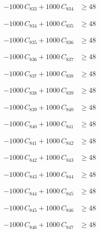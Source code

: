 \documentclass[a4paper,11pt]{article}
\begin{document}
\begin{align}
-1000\,C_{833} + 1000\,C_{834} &\geq 48 \nonumber
\end{align}

\begin{align}
-1000\,C_{834} + 1000\,C_{835} &\geq 48 \nonumber
\end{align}

\begin{align}
-1000\,C_{835} + 1000\,C_{836} &\geq 48 \nonumber
\end{align}

\begin{align}
-1000\,C_{836} + 1000\,C_{837} &\geq 48 \nonumber
\end{align}

\begin{align}
-1000\,C_{837} + 1000\,C_{838} &\geq 48 \nonumber
\end{align}

\begin{align}
-1000\,C_{838} + 1000\,C_{839} &\geq 48 \nonumber
\end{align}

\begin{align}
-1000\,C_{839} + 1000\,C_{840} &\geq 48 \nonumber
\end{align}

\begin{align}
-1000\,C_{840} + 1000\,C_{841} &\geq 48 \nonumber
\end{align}

\begin{align}
-1000\,C_{841} + 1000\,C_{842} &\geq 48 \nonumber
\end{align}

\begin{align}
-1000\,C_{842} + 1000\,C_{843} &\geq 48 \nonumber
\end{align}

\begin{align}
-1000\,C_{843} + 1000\,C_{844} &\geq 48 \nonumber
\end{align}

\begin{align}
-1000\,C_{844} + 1000\,C_{845} &\geq 48 \nonumber
\end{align}

\begin{align}
-1000\,C_{845} + 1000\,C_{846} &\geq 48 \nonumber
\end{align}

\begin{align}
-1000\,C_{846} + 1000\,C_{847} &\geq 48 \nonumber
\end{align}
\end{document}
